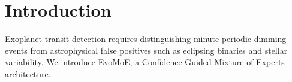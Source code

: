 \section{Introduction}
Exoplanet transit detection requires distinguishing minute periodic dimming events from astrophysical false positives such as eclipsing binaries and stellar variability. We introduce EvoMoE, a Confidence-Guided Mixture-of-Experts architecture.
